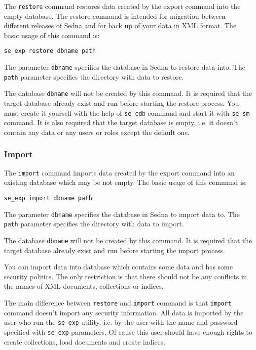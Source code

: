 \documentclass[a4paper,12pt]{article}
\begin{document}
The \verb!restore! command restores data created by the export command into the empty database.
The restore command is intended for migration between different releases of Sedna and for back
up of your data in XML format. The basic usage of this command is:

\begin{verbatim}
se_exp restore dbname path
\end{verbatim}  

The parameter \verb!dbname! specifies the database in Sedna to restore data into. The \verb!path!
parameter specifies the directory with data to restore. 

The database \verb!dbname! will not be created by this command. It is required that the target database 
already exist and run before starting the restore process. You must create it yourself with the help
of \verb!se_cdb! command and start it with \verb!se_sm! command. It is also required that the target 
database is empty, i.e. it doesn't contain any data or any users or roles except the default one.




\subsubsection*{Import}

The \verb!import! command imports data created by the export command into an existing database
which may be not empty. The basic usage of this command is:

\begin{verbatim}
se_exp import dbname path
\end{verbatim}  

The parameter \verb!dbname! specifies the database in Sedna to import data to. The \verb!path!
parameter specifies the directory with data to import. 

The database \verb!dbname! will not be created by this command. It is required that the target database 
already exist and run before starting the import process. 

You can import data into database which contains some data and has some security politics. The only
restriction is that there should not be any conflicts in the names of XML documents, collections or
indices. 

The main difference between \verb!restore! and \verb!import! command is that \verb!import! command 
doesn't import any security information. All data is imported by the user who run the \verb!se_exp! 
utility, i.e. by the user with the name and password specified with \verb!se_exp! parameters. Of cause 
this user should have enough rights to create collections, load documents and create indices.
\end{document}
